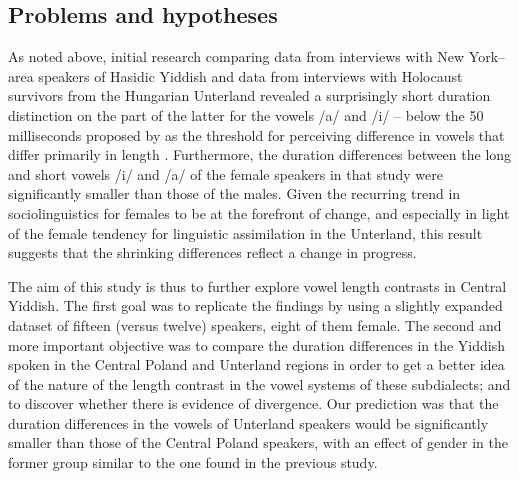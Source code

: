 \documentclass[output=paper,colorlinks,citecolor=brown]{langscibook}
\begin{document}
\subsection{Problems and hypotheses}
\label{sec:nove:3.3}

As noted above, initial research comparing data from interviews with New York–area speakers of Hasidic Yiddish and data from interviews with Holocaust survivors from the Hungarian Unterland revealed a surprisingly short duration distinction on the part of the latter for the vowels \mbox{/a/} and \mbox{/i/} -- below the 50 milliseconds proposed by \citet{LabovBaranowski2006} as the threshold for perceiving difference in vowels that differ primarily in length \citep{Nove2021}. Furthermore, the duration differences between the long and short vowels \mbox{/i/} and \mbox{/a/} of the female speakers in that study were significantly smaller than those of the males. Given the recurring trend in sociolinguistics for females to be at the forefront of change, and especially in light of the female tendency for linguistic assimilation in the Unterland, this result suggests that the shrinking differences reflect a change in progress.

The aim of this study is thus to further explore vowel length contrasts in Central Yiddish. The first goal was to replicate the findings by \citet{Nove2021} using a slightly expanded dataset of fifteen (versus twelve) speakers, eight of them female. The second and more important objective was to compare the duration differences in the Yiddish spoken in the Central Poland and Unterland regions in order to get a better idea of the nature of the length contrast in the vowel systems of these subdialects; and to discover whether there is evidence of divergence. Our prediction was that the duration differences in the vowels of Unterland speakers would be significantly smaller than those of the Central Poland speakers, with an effect of gender in the former group similar to the one found in the previous study.
\end{document}
